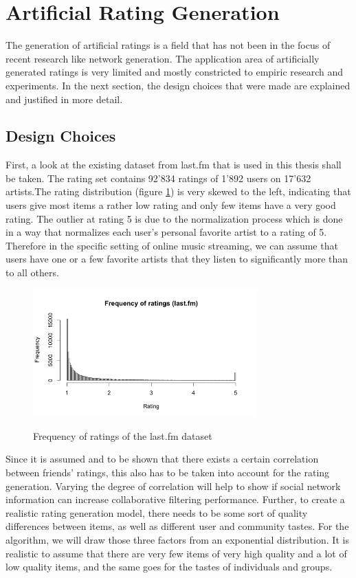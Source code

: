 \section{Artificial Rating Generation}
\label{st:artificialratinggeneration} The generation of artificial ratings is a field that has not been in the focus of recent research like network generation. The application area of artificially generated ratings is very limited and mostly constricted to empiric research and experiments. In the next section, the design choices that were made are explained and justified in more detail.

\subsection{Design Choices}
\label{sst:designchoices} First, a look at the existing dataset from last.fm that is used in this thesis shall be taken. The rating set contains 92'834 ratings of 1'892 users on 17'632 artists.The rating distribution (figure \ref{f:frequencyofratings}) is very skewed to the left, indicating that users give most items a rather low rating and only few items have a very good rating. The outlier at rating 5 is due to the normalization process which is done in a way that normalizes each user's personal favorite artist to a rating of 5. Therefore in the specific setting of online music streaming, we can assume that users have one or a few favorite artists that they listen to significantly more than to all others.

\begin{figure}[!ht]
\centering
\includegraphics[width=325px]{./3-artificialdata/figures/FrequencyOfRatings_Lastfm.png}
\label{f:frequencyofratings}
\caption{Frequency of ratings of the last.fm dataset}
\end{figure}

Since it is assumed and to be shown that there exists a certain correlation between friends' ratings, this also has to be taken into account for the rating generation. Varying the degree of correlation will help to show if social network information can increase collaborative filtering performance. Further, to create a realistic rating generation model, there needs to be some sort of quality differences between items, as well as different user and community tastes. For the algorithm, we will draw those three factors from an exponential distribution. It is realistic to assume that there are very few items of very high quality and a lot of low quality items, and the same goes for the tastes of individuals and groups.

